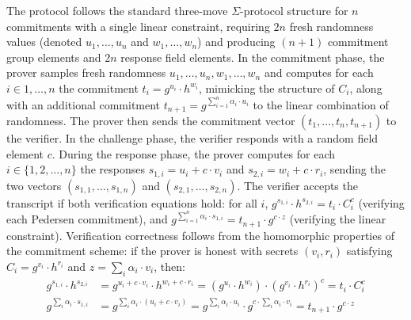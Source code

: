 \documentclass[sigconf,anonymous,review]{acmart}
\begin{document}
The protocol follows the standard three-move $\Sigma$-protocol structure for $n$ commitments with a single linear constraint, requiring $2n$ fresh randomness values (denoted $u_1, \ldots, u_n$ and $w_1, \ldots, w_n$) and producing $(n+1)$ commitment group elements and $2n$ response field elements. In the commitment phase, the prover samples fresh randomness $u_1, \ldots, u_n, w_1, \ldots, w_n$ and computes for each $i \in {1, \ldots, n}$ the commitment $t_i = g^{u_i} \cdot h^{w_i}$, mimicking the structure of $C_i$, along with an additional commitment $t_{n+1} = g^{\sum_{i=1}^{n} \alpha_i \cdot u_i}$ to the linear combination of randomness. The prover then sends the commitment vector $(t_1, \ldots, t_n, t_{n+1})$ to the verifier. In the challenge phase, the verifier responds with a random field element $c$. During the response phase, the prover computes for each $i \in \{1, 2, \dots, n\}$ the responses $s_{1,i} = u_i + c \cdot v_i$ and $s_{2,i} = w_i + c \cdot r_i$, sending the two vectors $(s_{1,1}, \ldots, s_{1,n})$ and $(s_{2,1}, \ldots, s_{2,n})$. The verifier accepts the transcript if both verification equations hold: for all $i$, $g^{s_{1,i}} \cdot h^{s_{2,i}} = t_i \cdot C_i^c$ (verifying each Pedersen commitment), and $g^{\sum_{i=1}^{n} \alpha_i \cdot s_{1,i}} = t_{n+1} \cdot g^{c \cdot z}$ (verifying the linear constraint). Verification correctness follows from the homomorphic properties of the commitment scheme: if the 
prover is honest with secrets $(v_i, r_i)$ satisfying $C_i = g^{v_i} \cdot h^{r_i}$ and 
$z = \sum_i \alpha_i \cdot v_i$, then:
\begin{align*}
g^{s_{1,i}} \cdot h^{s_{2,i}} &= g^{u_i + c \cdot v_i} \cdot h^{w_i + c \cdot r_i} = 
(g^{u_i} \cdot h^{w_i}) \cdot (g^{v_i} \cdot h^{r_i})^c = t_i \cdot C_i^c \\
g^{\sum_i \alpha_i \cdot s_{1,i}} &= g^{\sum_i \alpha_i \cdot (u_i + c \cdot v_i)} = 
g^{\sum_i \alpha_i \cdot u_i} \cdot g^{c \cdot \sum_i \alpha_i \cdot v_i} = t_{n+1} \cdot g^{c \cdot z}
\end{align*}
\end{document}
